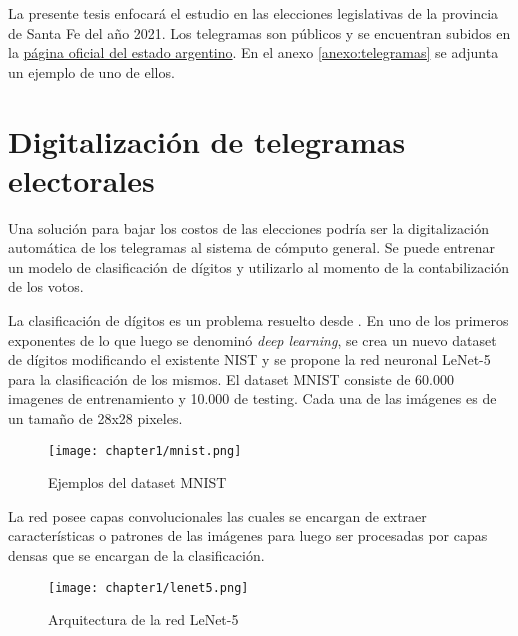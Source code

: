 La presente tesis enfocar\'a el estudio en las elecciones legislativas de la provincia de Santa Fe del a\~{n}o 2021.
Los telegramas son p\'ublicos y se encuentran subidos en la
\href{https://op.elecciones.gob.ar/telegramas/generales2021/}{p\'agina oficial del estado argentino}. En el anexo
\ref{anexo:telegramas} se adjunta un ejemplo de uno de ellos.

\section{Digitalizaci\'on de telegramas electorales}

Una soluci\'on para bajar los costos de las elecciones podr\'ia ser la digitalizaci\'on autom\'atica de los telegramas
al sistema de c\'omputo general. Se puede entrenar un modelo de clasificaci\'on de d\'igitos y utilizarlo al momento de
la contabilizaci\'on de los votos.

La clasificaci\'on de d\'igitos es un problema resuelto desde \citeyear{lecun1998gradient}. En uno de los primeros
exponentes de lo que luego se denomin\'o {\it deep learning}, \cite{lecun1998gradient} se crea un nuevo dataset de
d\'igitos modificando el existente NIST y se propone la red neuronal LeNet-5 para la clasificaci\'on de los mismos. El
dataset MNIST consiste de 60.000 imagenes de entrenamiento y 10.000 de testing. Cada una de las im\'agenes es de un
tama\~{n}o de 28x28 pixeles.

\begin{figure}[ht]
    \centering
    \texttt{[image: chapter1/mnist.png]}
    \caption{Ejemplos del dataset MNIST}
    \label{fig:mnist}
\end{figure}

La red posee capas convolucionales las cuales se encargan de extraer caracter\'isticas o patrones de las im\'agenes
para luego ser procesadas por capas densas que se encargan de la clasificaci\'on.

\begin{figure}[ht]
    \centering
    \texttt{[image: chapter1/lenet5.png]}
    \caption{Arquitectura de la red LeNet-5}
    \label{fig:lenet-5}
\end{figure}

